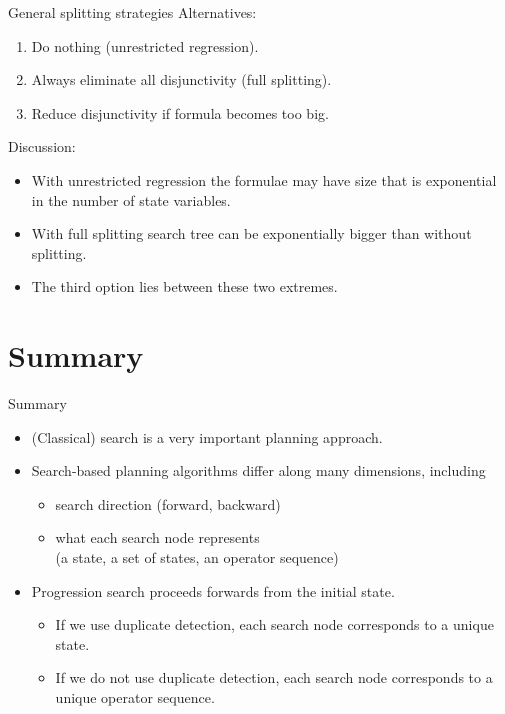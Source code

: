 \documentclass{gkibeamer}
\begin{document}
\begin{frame}{General splitting strategies}
  Alternatives:
  \begin{enumerate}
  \item Do nothing (\alert{unrestricted regression}).
  \item Always eliminate all disjunctivity
    (\alert{full splitting}).
  \item Reduce disjunctivity if formula becomes too big.
  \end{enumerate}

  \medskip

  Discussion:
  \begin{itemize}
  \item \alert{With unrestricted regression} the formulae may have
    \alert{size that is exponential} in the number of state variables.
  \item \alert{With full splitting} search tree can be
    \alert{exponentially bigger} than without splitting.
  \item The third option lies between these two extremes.
  \end{itemize}
\end{frame}

\section*{Summary}

\begin{frame}{Summary}
  \begin{itemize}
  \item (Classical) \alert{search} is a very important planning
    approach.
  \item Search-based planning algorithms differ along many dimensions,
    including
    \begin{itemize}
    \item \alert{search direction} (forward, backward)
    \item \alert{what each search node represents} \\
      (a state, a set of states, an operator sequence)
    \end{itemize}
  \item \alert{Progression search} proceeds forwards from the
    initial state.%
    \begin{itemize}
    \item If we use duplicate detection, each search node corresponds
      to a unique \alert{state}.
    \item If we do not use duplicate detection, each search node
      corresponds to a unique \alert{operator sequence}.
    \end{itemize}
  \end{itemize}
\end{frame}
\end{document}
